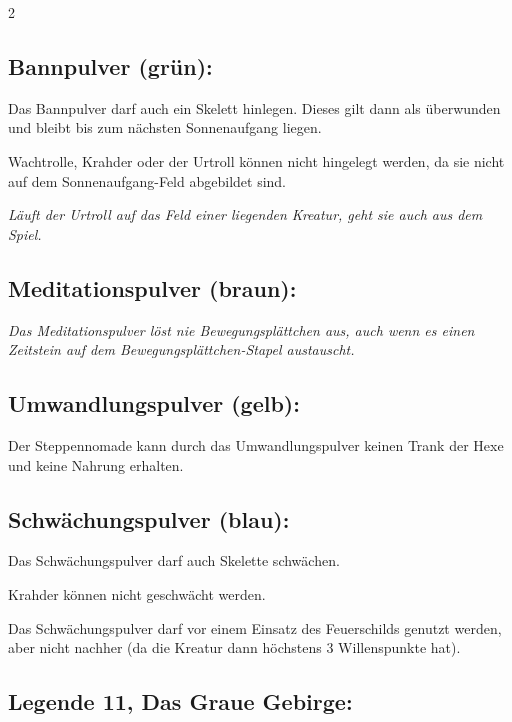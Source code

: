 \documentclass[10pt, a4paper, oneside]{book}
\newcommand{\fan}[1]{\textit{#1}}
\begin{document}
\begin{multicols*}{2}
\begin{bgcolor}
\subsection{Bannpulver (grün):}

Das Bannpulver darf auch ein Skelett hinlegen. Dieses gilt dann als überwunden und bleibt bis zum nächsten Sonnenaufgang liegen.
\supercite{MH:Begleitheft,88552}

Wachtrolle, Krahder oder der Urtroll können nicht hingelegt werden, da sie nicht auf dem Sonnenaufgang-Feld abgebildet sind.
\supercite{90058}

\fan{Läuft der Urtroll auf das Feld einer liegenden Kreatur, geht sie auch aus dem Spiel.}


\subsection{Meditationspulver (braun):}

\fan{Das Meditationspulver löst nie Bewegungsplättchen aus, auch wenn es einen Zeitstein auf dem Bewegungsplättchen-Stapel austauscht.}




\subsection{Umwandlungspulver (gelb):}

Der Steppennomade kann durch das Umwandlungspulver keinen Trank der Hexe\supercite{MH:Pulver} und keine Nahrung erhalten.
\supercite{88552}




\subsection{Schwächungspulver (blau):}

Das Schwächungspulver darf auch Skelette schwächen.
\supercite{MH:Begleitheft}

Krahder können nicht geschwächt werden.
\supercite{88552}

Das Schwächungspulver darf vor einem Einsatz des Feuerschilds genutzt werden, aber nicht nachher (da die Kreatur dann höchstens 3 Willenspunkte hat).
\supercite{91413}




\subsection{Legende 11, Das Graue Gebirge:}


\end{bgcolor}
\end{multicols*}
\end{document}
